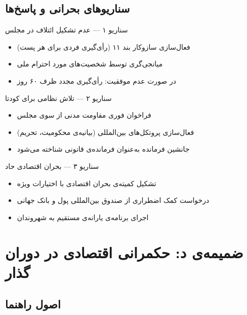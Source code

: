 \section{سناریوهای بحرانی و پاسخ‌ها}

\begin{bandbox}{سناریو ۱ --- عدم تشکیل ائتلاف در مجلس}
\begin{itemize}
  \item فعال‌سازی سازوکار بند ۱۱ (رأی‌گیری فردی برای هر پست)
  \item میانجی‌گری توسط شخصیت‌های مورد احترام ملی
  \item در صورت عدم موفقیت: رأی‌گیری مجدد ظرف ۶۰ روز
\end{itemize}
\end{bandbox}

\begin{bandbox}{سناریو ۲ --- تلاش نظامی برای کودتا}
\begin{itemize}
  \item فراخوان فوری مقاومت مدنی از سوی مجلس
  \item فعال‌سازی پروتکل‌های بین‌المللی (بیانیه‌ی محکومیت، تحریم)
  \item جانشین فرمانده به‌عنوان فرمانده‌ی قانونی شناخته می‌شود
\end{itemize}
\end{bandbox}

\begin{bandbox}{سناریو ۳ --- بحران اقتصادی حاد}
\begin{itemize}
  \item تشکیل کمیته‌ی بحران اقتصادی با اختیارات ویژه
  \item درخواست کمک اضطراری از صندوق بین‌المللی پول و بانک جهانی
  \item اجرای برنامه‌ی یارانه‌ی مستقیم به شهروندان
\end{itemize}
\end{bandbox}

\chapter{ضمیمه‌ی د: حکمرانی اقتصادی در دوران گذار}
\label{app:economic}

\section{اصول راهنما}

